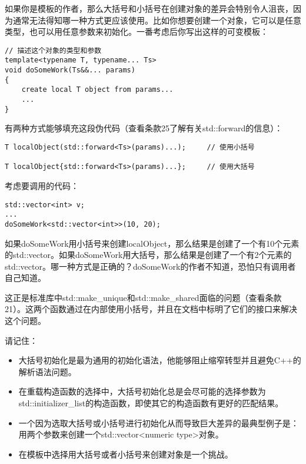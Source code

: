 如果你是模板的作者，那么大括号和小括号在创建对象的差异会特别令人沮丧，因为通常无法得知哪一种方式更应该使用。比如你想要创建一个对象，它可以是任意类型，也可以用任意参数来初始化。一番考虑后你写出这样的可变模板：

\begin{lstlisting}
// 描述这个对象的类型和参数
template<typename T, typename... Ts>		
void doSomeWork(Ts&&... params)
{
	create local T object from params...
	...
}
\end{lstlisting}

有两种方式能够填充这段伪代码（查看条款25了解有关std::forward的信息）：

\begin{lstlisting}
T localObject(std::forward<Ts>(params)...); 	// 使用小括号

T localObject{std::forward<Ts>(params)...}; 	// 使用大括号
\end{lstlisting}

考虑要调用的代码：

\begin{lstlisting}
std::vector<int> v;
...
doSomeWork<std::vector<int>>(10, 20);
\end{lstlisting}

如果doSomeWork用小括号来创建localObject，那么结果是创建了一个有10个元素的std::vector。如果doSomeWork用大括号，那么结果是创建了一个有2个元素的std::vector。哪一种方式是正确的？doSomeWork的作者不知道，恐怕只有调用者自己知道。

这正是标准库中std::make\_unique和std::make\_shared面临的问题（查看条款21）。这两个函数通过在内部使用小括号，并且在文档中标明了它们的接口来解决这个问题。

\begin{mdframed}
请记住：
\begin{itemize}
\item{大括号初始化是最为通用的初始化语法，他能够阻止缩窄转型并且避免C++的解析语法问题。}
\item{在重载构造函数的选择中，大括号初始化总是会尽可能的选择参数为std::initializer\_list的构造函数，即使其它的构造函数有更好的匹配结果。} 
\item{一个因为选取大括号或小括号进行初始化从而导致巨大差异的最典型例子是：用两个参数来创建一个std::vector<numeric type>对象。} 
\item{在模板中选择用大括号或者小括号来创建对象是一个挑战。} 
\end{itemize}
\end{mdframed}








